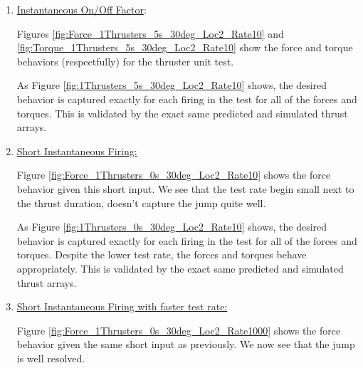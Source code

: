 \begin{enumerate}
	\item{\underline{ Instantaneous On/Off Factor}:} 
	
	
	
	Figures \ref{fig:Force_1Thrusters_5s_30deg_Loc2_Rate10} and \ref{fig:Torque_1Thrusters_5s_30deg_Loc2_Rate10} show the force and torque behaviors (respectfully) for the thruster unit test.
	
	
	
	
	
	As Figure \ref{fig:1Thrusters_5s_30deg_Loc2_Rate10} shows, the desired behavior is captured exactly for each 
	firing in the test for all of the forces and torques. This is validated by the exact same predicted and simulated thrust arrays.  
	
	\item{\underline{Short Instantaneous Firing: }}
	
	
	
	Figure \ref{fig:Force_1Thrusters_0s_30deg_Loc2_Rate10} shows the force behavior given this short input. We see that the test rate begin small next to the thrust duration, doesn't capture the jump quite well.
	
	
	
	
	As Figure \ref{fig:1Thrusters_0s_30deg_Loc2_Rate10} shows, the desired behavior is captured exactly for each 
	firing in the test for all of the forces and torques. Despite the lower test rate, the forces and torques behave appropriately. This is validated by the exact same predicted and simulated thrust arrays.
	
	\item{\underline{Short Instantaneous Firing with faster test rate: }}
	
	
	
	Figure \ref{fig:Force_1Thrusters_0s_30deg_Loc2_Rate1000} shows the force behavior given the same short input as previously. We now see that the jump is well resolved.
	
	
	
	

\end{enumerate}
